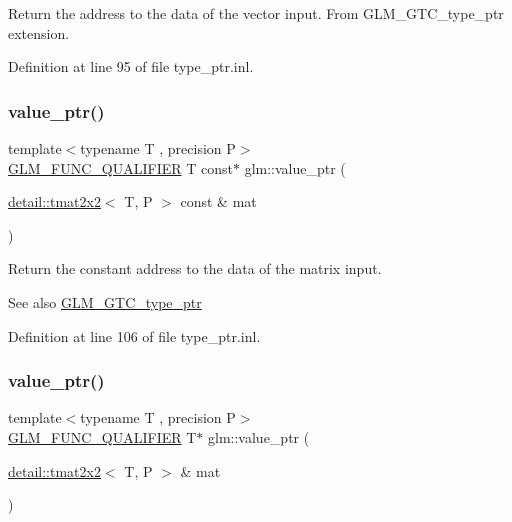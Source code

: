 Return the address to the data of the vector input. From G\+L\+M\+\_\+\+G\+T\+C\+\_\+type\+\_\+ptr extension. 

Definition at line 95 of file type\+\_\+ptr.\+inl.

\mbox{\label{group__gtc__type__ptr_ga013fcf415d78cc3aa9273c5d4f780325}} 
\subsubsection{\texorpdfstring{value\+\_\+ptr()}{value\_ptr()}\hspace{0.1cm}{\footnotesize\ttfamily [8/27]}}
{\footnotesize\ttfamily template$<$typename T , precision P$>$ \\
\hyperlink{setup_8hpp_a33fdea6f91c5f834105f7415e2a64407}{G\+L\+M\+\_\+\+F\+U\+N\+C\+\_\+\+Q\+U\+A\+L\+I\+F\+I\+ER} T const$\ast$ glm\+::value\+\_\+ptr (\begin{DoxyParamCaption}\item[{\hyperlink{structglm_1_1detail_1_1tmat2x2}{detail\+::tmat2x2}$<$ T, P $>$ const \&}]{mat }\end{DoxyParamCaption})}

Return the constant address to the data of the matrix input. \begin{DoxySeeAlso}{See also}
\hyperlink{group__gtc__type__ptr}{G\+L\+M\+\_\+\+G\+T\+C\+\_\+type\+\_\+ptr} 
\end{DoxySeeAlso}


Definition at line 106 of file type\+\_\+ptr.\+inl.

\mbox{\label{group__gtc__type__ptr_ga11e5b6c0d7d5d2627df624bb4b219f20}} 
\subsubsection{\texorpdfstring{value\+\_\+ptr()}{value\_ptr()}\hspace{0.1cm}{\footnotesize\ttfamily [9/27]}}
{\footnotesize\ttfamily template$<$typename T , precision P$>$ \\
\hyperlink{setup_8hpp_a33fdea6f91c5f834105f7415e2a64407}{G\+L\+M\+\_\+\+F\+U\+N\+C\+\_\+\+Q\+U\+A\+L\+I\+F\+I\+ER} T$\ast$ glm\+::value\+\_\+ptr (\begin{DoxyParamCaption}\item[{\hyperlink{structglm_1_1detail_1_1tmat2x2}{detail\+::tmat2x2}$<$ T, P $>$ \&}]{mat }\end{DoxyParamCaption})}

